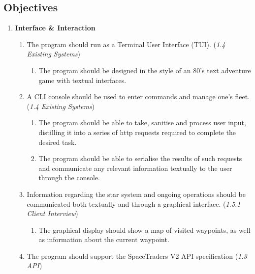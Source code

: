 \subsection{Objectives}
\begin{enumerate}
    \item \textbf{Interface \& Interaction}
    \begin{enumerate}
        \item The program should run as a Terminal User Interface (TUI). (\textit{1.4 Existing Systems})
            \begin{enumerate}
                \item The program should be designed in the style of an 80's text adventure game with textual interfaces.
            \end{enumerate}
        \item A CLI console should be used to enter commands and manage one's fleet. (\textit{1.4 Existing Systems})
            \begin{enumerate}
                \item The program should be able to take, sanitise and process user input, distilling it into a series of http requests required to complete the desired task. 
                \item The program should be able to serialise the results of such requests and communicate any relevant information textually to the user through the console.
            \end{enumerate}
        \item Information regarding the star system and ongoing operations should be communicated both textually and through a graphical interface. (\textit{1.5.1 Client Interview})
            \begin{enumerate}
                \item The graphical display should show a map of visited waypoints, as well as information about the current waypoint.
            \end{enumerate}
        \item The program should support the SpaceTraders V2 API specification (\textit{1.3 API})
    \end{enumerate}


\end{enumerate}
